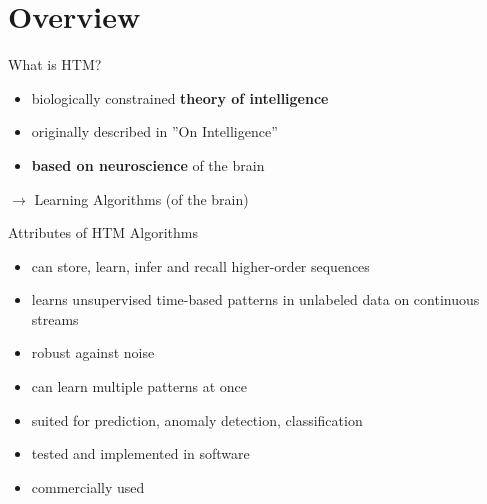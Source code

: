 \section{Overview}


\begin{frame}[c]{What is HTM?}
    \begin{itemize}[<+(1)->]
        \item biologically constrained \textbf{theory of intelligence}
        \item originally described in ''On Intelligence''
        \item \textbf{based on neuroscience} of the brain
    \end{itemize}

    \vspace{0.5cm}

    \pause

    $\rightarrow$ Learning Algorithms \pause (of the brain)
\end{frame}


\begin{frame}[c]{Attributes of HTM Algorithms}
    \begin{itemize}[<+(1)->]
        \item can store, learn, infer and recall higher-order sequences
        \item learns unsupervised time-based patterns in unlabeled data on continuous streams
        \item robust against noise
        \item can learn multiple patterns at once
        \item suited for prediction, anomaly detection, classification
        \item tested and implemented in software
        \item commercially used
    \end{itemize}
\end{frame}




